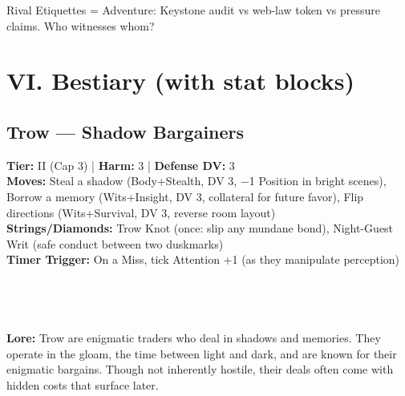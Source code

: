 \documentclass[11pt]{article}
\begin{document}
Rival Etiquettes = Adventure: Keystone audit vs web-law token vs pressure claims. Who witnesses whom?

\section{VI. Bestiary (with stat blocks)}
\label{sec:bestiary}

\subsection*{Trow --- Shadow Bargainers}
\textbf{Tier:} II (Cap 3) | \textbf{Harm:} 3 | \textbf{Defense DV:} 3 \\
\textbf{Moves:} Steal a shadow (Body+Stealth, DV 3, −1 Position in bright scenes), Borrow a memory (Wits+Insight, DV 3, collateral for future favor), Flip directions (Wits+Survival, DV 3, reverse room layout) \\
\textbf{Strings/Diamonds:} Trow Knot (once: slip any mundane bond), Night-Guest Writ (safe conduct between two duskmarks) \\
\textbf{Timer Trigger:} On a Miss, tick Attention +1 (as they manipulate perception) \\
 \\
 \\
 \\
 \\
\textbf{Lore:} Trow are enigmatic traders who deal in shadows and memories. They operate in the gloam, the time between light and dark, and are known for their enigmatic bargains. Though not inherently hostile, their deals often come with hidden costs that surface later.
\end{document}
